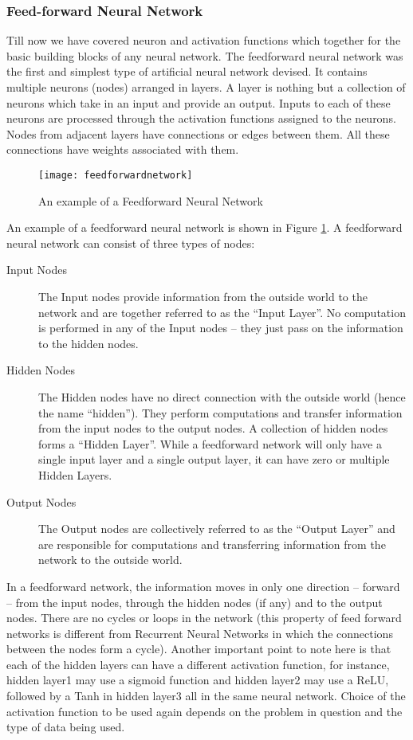 \subsubsection{Feed-forward Neural Network}
Till now we have covered neuron and activation functions which together for the basic building blocks of any neural network. The feedforward
neural network was the first and simplest type of artificial neural network devised. It contains multiple neurons (nodes) arranged in layers.
A layer is nothing but a collection of neurons which take in an input and provide an output. Inputs to each of these neurons are processed
through the activation functions assigned to the neurons. Nodes from adjacent layers have connections or edges between them. All these connections have weights associated with them.
\begin{figure}[h]
  \centering
  \texttt{[image: feedforwardnetwork]}
  \caption{An example of a Feedforward Neural Network}
  \label{fig:feedforwardnetwork}
\end{figure}
An example of a feedforward neural network is shown in Figure \ref{fig:feedforwardnetwork}. A feedforward neural network can consist of three types of nodes:
\begin{description}
\item[ Input Nodes ] The Input nodes provide information from the outside world to the network and are together referred to as the
  “Input Layer”. No computation is performed in any of the Input nodes – they just pass on the information to the hidden nodes.
\item[  Hidden Nodes ]  The Hidden nodes have no direct connection with the outside world (hence the name “hidden”). They perform
  computations and transfer information from the input nodes to the output nodes. A collection of hidden nodes forms a “Hidden Layer”.
  While a feedforward network will only have a single input layer and a single output layer, it can have zero or multiple Hidden Layers.
\item [ Output Nodes ] The Output nodes are collectively referred to as the “Output Layer” and are responsible for computations and
  transferring information from the network to the outside world.
\end{description}

In a feedforward network, the information moves in only one direction – forward – from the input nodes, through the hidden nodes (if any)
and to the output nodes. There are no cycles or loops in the network (this property of feed forward networks is different from Recurrent
Neural Networks in which the connections between the nodes form a cycle). Another important point to note here is that each of the hidden
layers can have a different activation function, for instance, hidden layer1 may use a sigmoid function and hidden layer2 may use a ReLU,
followed by a Tanh in hidden layer3 all in the same neural network. Choice of the activation function to be used again depends on the
problem in question and the type of data being used.

